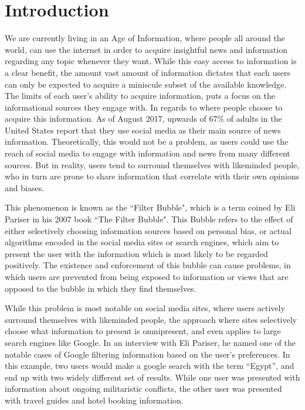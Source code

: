 \chapter{Introduction}
We are currently living in an Age of Information, where people all around the
world, can use the internet in order to acquire insightful news and information
regarding any topic whenever they want. While this easy access to information is
a clear benefit, the amount vast amount of information dictates that each
users can only be expected to acquire a miniscule subset of the available
knowledge.\\
The limits of each user's ability to acquire information, puts a focus on the
informational sources they engage with. In regards to where people choose to
acquire this information. As of August 2017, upwards of 67\% of adults in the
United States report that they use social media as their main source of news
information\citep{journalism2017}. Theoretically, this would not be a problem,
as users could use the reach of social media to engage with information and
news from many different sources. But in reality, users tend to surround
themselves with likeminded people, who in turn are prone to share information
that correlate with their own opinions and biases.\nl

This phenomenon is known as the ``Filter Bubble", which is a term coined by Eli
Pariser in his 2007 book ``The Filter Bubble"\citep{pariser2011filter}. This
Bubble refers to the effect of either selectively choosing information sources
based on personal bias, or actual algorithms encoded in the social media sites
or search engines, which aim to present the user with the information which is
most likely to be regarded positively. The existence and enforcement of this
bubble can cause problems, in which users are prevented from being exposed to
information or views that are opposed to the bubble in which they find
themselves.\nl

While this problem is most notable on social media sites, where users actively
surround themselves with likeminded people, the approach where sites selectively
choose what information to present is omnipresent, and even applies to large
search engines like Google\citep{filterBubbleDef}. In an interview with Eli
Pariser, he named one of the notable cases of Google filtering information based
on the user's preferences. In this example, two users would make a google search
with the term ``Egypt'', and end up with two widely different set of results.
While one user was presented with information about ongoing militaristic
conflicts, the other user was presented with travel guides and hotel booking
information\citep{nusSduSearch}.
